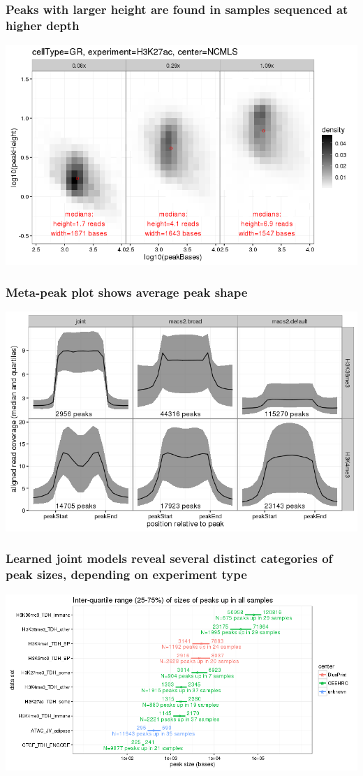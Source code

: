 \documentclass{beamer}
\begin{document}
\begin{frame}
  \frametitle{Peaks with larger height are found in samples sequenced at higher depth}
  
\includegraphics[width=\textwidth]{figure-compare-size-height-GR-H2K27ac-NCMLS.png}
\end{frame}

\begin{frame}
  \frametitle{Meta-peak plot shows average peak shape}
  
\includegraphics[width=\textwidth]{figure-joint-peaks-meta.png}
\end{frame}

\begin{frame}
  \frametitle{Learned joint models reveal several distinct categories of peak sizes, depending on experiment type}
  
\includegraphics[width=\textwidth]{figure-compare-size-allup.png}
\end{frame}
\end{document}
